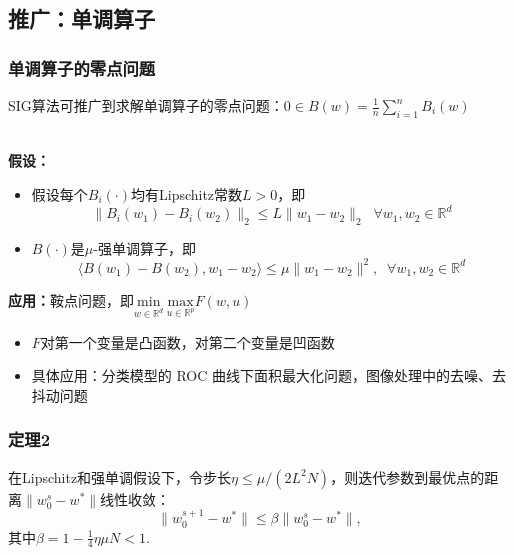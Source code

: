 \subsection{推广：单调算子}
  \frame
  {
    \frametitle{单调算子的零点问题}
    \footnotesize
    SIG算法可推广到求解单调算子的零点问题：$0 \in B(w) = \frac{1}{n}\sum_{i=1}^n B_i(w)$ \\~\\

    \pause

    \textbf{假设：}
    \begin{itemize}
        \item 假设每个$B_i(\cdot)$均有Lipschitz常数$L > 0$，即
        $$
        \| B_i(w_1) - B_i(w_2) \|_2 \le L \| w_1 - w_2 \|_2 \;\; \forall w_1, w_2 \in \mathbb{R}^d
        $$
        \item $B(\cdot)$是$\mu$-强单调算子，即
        $$
        \langle B(w_1) - B(w_2), w_1 - w_2 \rangle \le \mu \| w_1 - w_2 \|^2, \;\; \forall w_1, w_2 \in \mathbb{R}^d
        $$
    \end{itemize}

    \pause
    \begin{block}{}
    \textbf{应用：}鞍点问题，即$\underset{w \in \mathbb{R}^d}{\mathrm{min}} \ \underset{u \in \mathbb{R}^p}{\mathrm{max}} F(w, u)$
    \begin{itemize}
        \item $F$对第一个变量是凸函数，对第二个变量是凹函数
        \item 具体应用：分类模型的 ROC 曲线下面积最大化问题，图像处理中的去噪、去抖动问题
    \end{itemize}
    \end{block}
  }

  \frame
  {
    \frametitle{定理2}
    \begin{block}{}
    在Lipschitz和强单调假设下，令步长$\eta \le \mu/(2L^2N)$，则迭代参数到最优点的距离$\|w_0^s - w^*\|$线性收敛：
    $$
    \| w_0^{s+1} - w^* \| \le \beta \| w_0^{s} - w^* \|,
    $$
    其中$\beta = 1 - \frac{1}{4} \eta \mu N < 1$.
    \end{block}
  }
